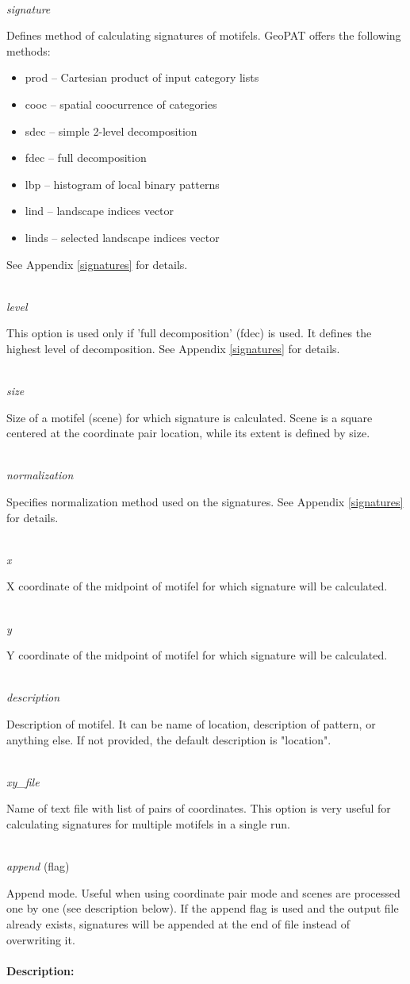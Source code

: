\documentclass[12pt,margin=0.5in]{article}
\newcommand{\newoption}[1]{\mbox{}\\{\it #1}}
\begin{document}
\newoption{signature}

Defines method of calculating signatures of motifels. GeoPAT offers the following methods: 
\begin{itemize}
	\item prod -- Cartesian product of input category lists
	\item cooc -- spatial coocurrence of categories
	\item sdec -- simple 2-level decomposition
	\item fdec -- full decomposition
	\item lbp -- histogram of local binary patterns
	\item lind -- landscape indices vector
	\item linds -- selected landscape indices vector
\end{itemize}
See Appendix \ref{signatures} for details.

\newoption{level}

This option is used only if 'full decomposition' (fdec) is used. It defines the highest level of decomposition. See Appendix \ref{signatures} for details.

\newoption{size}

Size of a motifel (scene) for which signature is calculated. Scene is a square centered at the coordinate pair location, while its extent is defined by size. 

\newoption{normalization}

Specifies normalization method used on the signatures. See Appendix \ref{signatures} for details.

\newoption{x}

X coordinate of the midpoint of motifel for which signature will be calculated.

\newoption{y}

Y coordinate of the midpoint of motifel for which signature will be calculated.

\newoption{description}

Description of motifel. It can be name of location, description of pattern, or anything else. If not provided, the default description is "location".

\newoption{xy\_file}

Name of text file with list of pairs of coordinates. This option is very useful for calculating signatures for multiple motifels in a single run.

\newoption{append} (flag)

Append mode. Useful when using coordinate pair mode and scenes are processed one by one (see description below). If the append flag is used and the output file already exists, signatures will be appended at the end of file instead of overwriting it.
\\\\
{\bf Description:}
\end{document}
